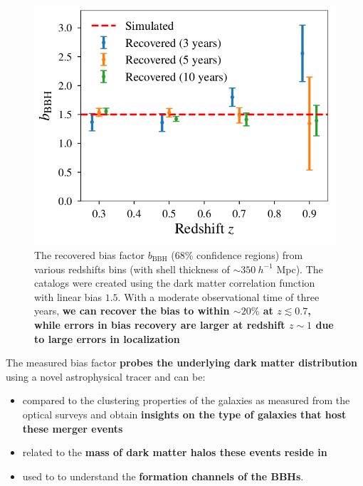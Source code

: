 \documentclass[a1,portrait]{a1poster}
\begin{document}
\begin{textblock}{7}
\begin{figure}[t]
	\centering
	\includegraphics[scale=0.65]{moneyplot.png}
	\caption{\small{The recovered bias factor $b_\mathrm{BBH}$ ({68\%} confidence regions) from various redshifts bins (with shell thickness of $\sim 350~h^{-1}$ Mpc). The catalogs were created using the dark matter correlation function with  linear bias $1.5$. With a moderate observational time of three years, \textbf{we can recover the bias to within $\sim 20\%$ at $z \lesssim 0.7$, while errors in bias recovery are larger at redshift $z \sim 1$ due to large errors in localization}}}
\end{figure}
The measured bias factor \textbf{probes the underlying dark matter distribution} using a novel astrophysical tracer and can be:
\begin{itemize}
	\item compared to the clustering properties of the galaxies as measured from the optical surveys  and obtain \textbf{insights on the type of galaxies that host these merger events}
	\item related to the \textbf{mass of dark matter halos these events reside in}
	\item used to to understand the \textbf{formation channels of the BBHs}.
\end{itemize}
\end{textblock}
\end{document}

